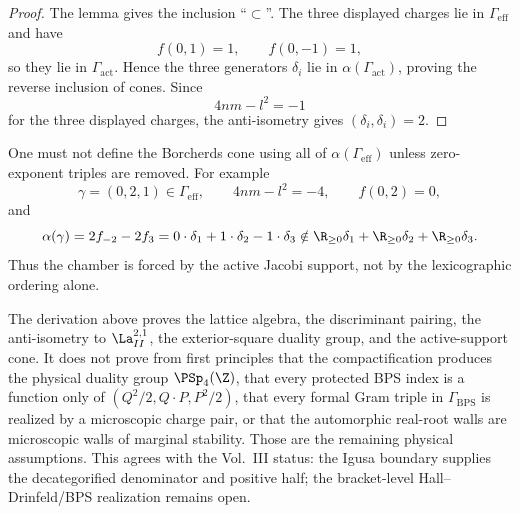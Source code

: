 \begin{proof}
The lemma gives the inclusion ``$\subset$''.  The three displayed
charges lie in $\Gamma_{\mathrm{eff}}$ and have
$$
f(0,1)=1,\qquad f(0,-1)=1,
$$
so they lie in $\Gamma_{\mathrm{act}}$.  Hence the three generators
$\delta_i$ lie in $\alpha(\Gamma_{\mathrm{act}})$, proving the reverse
inclusion of cones.  Since
$$
4nm-l^2=-1
$$
for the three displayed charges, the anti-isometry gives
$(\delta_i,\delta_i)=2$.
\end{proof}

\begin{remark}
One must not define the Borcherds cone using all of
$\alpha(\Gamma_{\mathrm{eff}})$ unless zero-exponent triples are
removed.  For example
$$
\gamma=(0,2,1)\in\Gamma_{\mathrm{eff}},
\qquad
4nm-l^2=-4,
\qquad
f(0,2)=0,
$$
and
$$
\alpha(\gamma)=2f_{-2}-2f_3
=0\cdot\delta_1+1\cdot\delta_2-1\cdot\delta_3
\notin\R_{\geq0}\delta_1+\R_{\geq0}\delta_2+\R_{\geq0}\delta_3.
$$
Thus the chamber is forced by the active Jacobi support, not by the
lexicographic ordering alone.
\end{remark}

\begin{remark}
The derivation above proves the lattice algebra, the discriminant
pairing, the anti-isometry to $\La^{2,1}_{II}$, the exterior-square
duality group, and the active-support cone.  It does not prove from
first principles that the compactification produces the physical
duality group $\PSp_4(\Z)$, that every protected BPS index is a function
only of $(Q^2/2,Q\cdot P,P^2/2)$, that every formal Gram triple in
$\Gamma_{\mathrm{BPS}}$ is realized by a microscopic charge pair, or
that the automorphic real-root walls are microscopic walls of marginal
stability.  Those are the remaining physical assumptions.  This agrees
with the Vol.~III status: the Igusa boundary supplies the
decategorified denominator and positive half; the bracket-level
Hall--Drinfeld/BPS realization remains open.
\end{remark}
